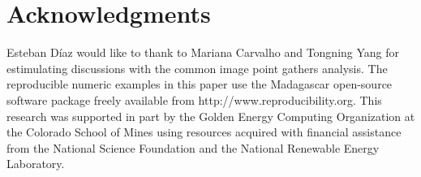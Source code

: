 \section{Acknowledgments}
Esteban D\'{i}az would like to thank to Mariana Carvalho and Tongning Yang for estimulating discussions
with the common image point gathers analysis.
%
%
The reproducible numeric examples in this paper use the Madagascar open-source software package freely available from http://www.reproducibility.org.
%
This research was supported in part by the Golden Energy Computing Organization at the Colorado School of Mines using resources acquired with financial assistance from the National Science Foundation and the National Renewable Energy Laboratory.
